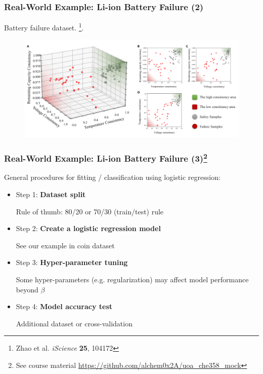 \documentclass[10pt,aspectratio=169]{beamer}
\begin{document}
      \begin{frame}
        \frametitle{Real-World Example: Li-ion Battery Failure (2)}
        Battery failure
        dataset. \let\thefootnote\relax\footnote{{\scriptsize Zhao et
            al. \textit{iScience} \textbf{25}, 104172}}.

        \begin{figure}[t]
          \includegraphics[width=1.0\linewidth]{images/battery_2.png}
        \end{figure}
      \end{frame}

      \begin{frame}
        \frametitle{Real-World Example: Li-ion Battery Failure
          (3)\let\thefootnote\relax\footnote{{\scriptsize See course
              material
              \url{https://github.com/alchem0x2A/uoa_che358_mock}}}}
        
        General procedures for fitting / classification using logistic
        regression:
        
        \begin{itemize}
          \vfill \item Step 1: \textbf{Dataset split}

          Rule of thumb: 80/20 or 70/30 (train/test) rule
          
          \vfill \item Step 2:\textbf{ Create a logistic regression
            model}

          See our example in coin dataset
          
          \vfill \item Step 3: \textbf{Hyper-parameter tuning}

          Some hyper-parameters (e.g. regularization) may affect model
          performance beyond $\beta$
          
          \vfill \item Step 4: \textbf{Model accuracy test}

          Additional dataset or cross-validation
        \end{itemize}
        
        
      \end{frame}
\end{document}
